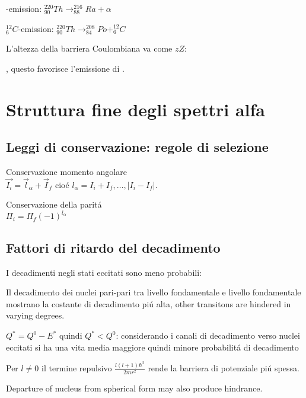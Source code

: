 \begin{itemize*}
\item \Ra-emission: $^{220}_{90}Th\rightarrow^{216}_{88}Ra+\alpha$\\
\item $^{12}_6C$-emission: $^{220}_{90}Th\rightarrow^{208}_{84}Po+^{12}_6C$\\
\end{itemize*}
L'altezza della barriera Coulombiana va come $zZ$:

, questo favorisce l'emissione di \Ra.

\chapter{Struttura fine degli spettri alfa}

\section{Leggi di conservazione: regole di selezione}

\begin{itemize*}
\item Conservazione momento angolare\\
$\vec{I_i}=\vec{l}_{\alpha}+\vec{I}_f$ cio\'e $l_{\alpha}=I_i+I_f,\ldots,|I_i-I_f|$.
\item Conservazione della parit\'a\\
$\Pi_i=\Pi_f(-1)^{l_{\alpha}}$
\end{itemize*}

\section{Fattori di ritardo del decadimento}
I decadimenti \Ra  negli stati eccitati sono meno probabili:

Il decadimento dei nuclei pari-pari tra livello fondamentale e livello fondamentale mostrano la costante di decadimento pi\'u alta, other transitons are hindered in varying degrees. 
\begin{itemize*}
\item $Q^*=Q^0-E^*$ quindi $Q^*<Q^0$: considerando i canali di decadimento verso nuclei eccitati si ha una vita media maggiore quindi minore probabilit\'a di decadimento
\item Per $l\neq0$ il termine repulsivo $\frac{l(l+1)\hbar^2}{2mr^2}$ rende la barriera di potenziale pi\'u spessa.
\item Departure of nucleus from spherical form may also produce hindrance.
\end{itemize*}
 
